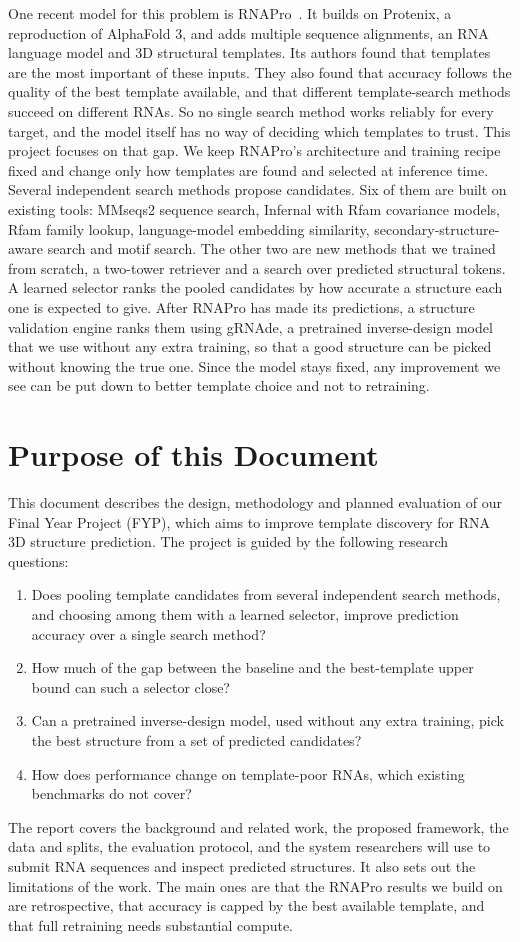 \documentclass{FastFyp}
\begin{document}
One recent model for this problem is RNAPro~\cite{leerna}. It builds on Protenix, a reproduction of AlphaFold 3, and adds multiple sequence alignments, an RNA language model and 3D structural templates. Its authors found that templates are the most important of these inputs. They also found that accuracy follows the quality of the best template available, and that different template-search methods succeed on different RNAs. So no single search method works reliably for every target, and the model itself has no way of deciding which templates to trust. This project focuses on that gap. We keep RNAPro's architecture and training recipe fixed and change only how templates are found and selected at inference time. Several independent search methods propose candidates. Six of them are built on existing tools: MMseqs2 sequence search, Infernal with Rfam covariance models, Rfam family lookup, language-model embedding similarity, secondary-structure-aware search and motif search. The other two are new methods that we trained from scratch, a two-tower retriever and a search over predicted structural tokens. A learned selector ranks the pooled candidates by how accurate a structure each one is expected to give. After RNAPro has made its predictions, a structure validation engine ranks them using gRNAde, a pretrained inverse-design model that we use without any extra training, so that a good structure can be picked without knowing the true one. Since the model stays fixed, any improvement we see can be put down to better template choice and not to retraining.

\section{Purpose of this Document}
This document describes the design, methodology and planned evaluation of our Final Year Project (FYP), which aims to improve template discovery for RNA 3D structure prediction. The project is guided by the following research questions:
\begin{enumerate}
    \item Does pooling template candidates from several independent search methods, and choosing among them with a learned selector, improve prediction accuracy over a single search method?
    \item How much of the gap between the baseline and the best-template upper bound can such a selector close?
    \item Can a pretrained inverse-design model, used without any extra training, pick the best structure from a set of predicted candidates?
    \item How does performance change on template-poor RNAs, which existing benchmarks do not cover?
\end{enumerate}
The report covers the background and related work, the proposed framework, the data and splits, the evaluation protocol, and the system researchers will use to submit RNA sequences and inspect predicted structures. It also sets out the limitations of the work. The main ones are that the RNAPro results we build on are retrospective, that accuracy is capped by the best available template, and that full retraining needs substantial compute.
\end{document}
